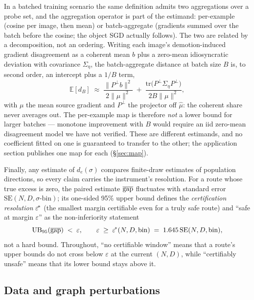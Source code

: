 In a batched training scenario the same definition admits two
aggregations over a probe set, and the aggregation operator is part of
the estimand: per-example (cosine per image, then mean) or
batch-aggregate (gradients summed over the batch before the cosine;
the object SGD actually follows). The two are related by a
decomposition, not an ordering. Writing each image's demotion-induced
gradient disagreement as a coherent mean $b$ plus a zero-mean
idiosyncratic deviation with covariance $\Sigma_\eta$, the
batch-aggregate distance at batch size $B$ is, to second order, an
intercept plus a $1/B$ term,
\begin{equation*}
\mathbb{E}[d_B] \;\approx\;
\frac{\|P^{\perp} b\|^2}{2\|\mu\|^2}
\;+\;
\frac{\mathrm{tr}\!\big(P^{\perp} \Sigma_\eta P^{\perp}\big)}{2B\|\mu\|^2},
\end{equation*}
with $\mu$ the mean source gradient and $P^{\perp}$ the projector off
$\hat\mu$: the coherent share never averages out. The per-example map
is therefore \emph{not} a lower bound for larger batches --- monotone
improvement with $B$ would require an iid zero-mean disagreement
model we have not verified. These are different
estimands, and no coefficient fitted on one is guaranteed to transfer
to the other; the application section publishes one map for each
(\S\ref{sec:map}).

Finally, any estimate of $d_e(\sigma)$ compares finite-draw estimates
of population directions, so every claim carries the instrument's
resolution. For a route whose true excess is zero, the paired estimate
$\overline{\mathrm{gap}}$ fluctuates with standard error
$\mathrm{SE}(N, D, \sigma\text{-bin})$; its one-sided 95\% upper bound
defines the \emph{certification resolution} $\varepsilon^{\!*}$ (the
smallest margin certifiable even for a truly safe route) and ``safe
at margin $\varepsilon$'' as the non-inferiority statement
\begin{equation}
\text{UB}_{95}\!\left(\overline{\mathrm{gap}}\right) \;<\; \varepsilon,
\qquad
\varepsilon \;\ge\; \varepsilon^{\!*}(N, D, \text{bin})
\;=\; 1.645\,\mathrm{SE}(N, D, \text{bin}),
\label{eq:safe}
\end{equation}
not a hard bound. Throughout, ``no certifiable window'' means that a
route's upper bounds do not cross below $\varepsilon$ at the current
$(N, D)$, while ``certifiably unsafe'' means that its lower bound stays
above it.

\subsection{Data and graph perturbations}
\label{sec:branches}

